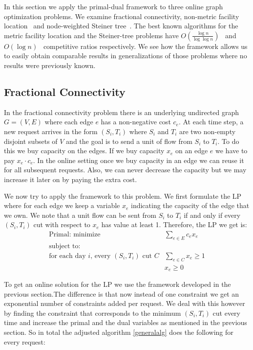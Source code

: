 In this section we apply the primal-dual framework to three online graph optimization problems. We examine fractional connectivity, non-metric facility location~\cite{Alon06:opt} and node-weighted Steiner tree~\cite{naor11:node-weighted-steiner-tree}. The best known algorithms for the metric facility location and the Steiner-tree problems have $O(\frac{ \log n }{ \log \log n} )$~\cite{fotakis03:facility} and $O({ \log n} )$~\cite{imase91:dynamic-steiner} competitive ratios respectively. We see how the framework allows us to easily obtain comparable results in generalizations of those problems where no results were previously known.

\subsection{Fractional Connectivity}

In the fractional connectivity problem there is an underlying undirected graph $G = (V,E)$ where each edge $e$ has a non-negative cost $c_e$. At each time step, a new request arrives in the form $(S_i,T_i)$ where $S_i$ and $T_i$ are two non-empty disjoint subsets of $V$ and the goal is to send a unit of flow from $S_i$ to $T_i$. To do this we buy capacity on the edges. If we buy capacity $x_e$ on an edge $e$ we have to pay $x_e \cdot c_e$. In the online setting once we buy capacity in an edge we can reuse it for all subsequent requests. Also, we can never decrease the capacity but we may increase it later on by paying the extra cost.

We now try to apply the framework to this problem. We first formulate the LP where for each edge we keep a variable $x_e$ indicating the capacity of the edge that we own. We note that a unit flow can be sent from $S_i$ to $T_i$ if and only if every $(S_i, T_i)$ cut with respect to $x_e$ has value at least 1. Therefore, the LP we get is: 
\[
	\begin{array}{lr}
	\textrm{Primal: minimize}   & \sum_{e \in E} c_e x_e   \\
	\textrm{subject to:} & \\
	\textrm{for each day $i$, every $(S_i,T_i)$ cut $C$} & \sum_{e \in C} x_e  \ge 1  \\
			    & x_e \geq 0
	\end{array}
\]

To get an online solution for the LP we use the framework developed in the previous section.The difference is that now instead of one constraint we get an exponential number of constraints added per request. We deal with this however by finding the constraint that corresponds to the minimum $(S_i,T_i)$ cut every time and increase the primal and the dual variables as mentioned in the previous section. So in total the adjusted algorithm \ref{generalalg} does the following for every request:

